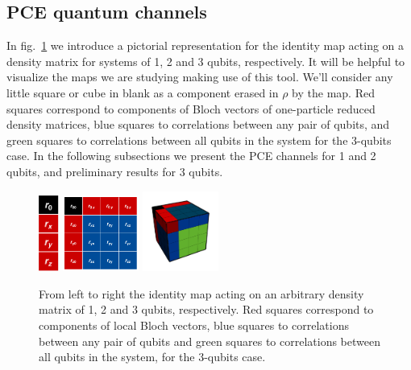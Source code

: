 \documentclass[11pt,dvipsnames]{article} %
\newcommand{\fref}[1]{fig.~\ref{#1}}
\newcommand{\1}{\mathds{1}}
\begin{document}
\subsection*{PCE quantum channels}
In \fref{fig:pictorial-rep-rho} we introduce a pictorial representation 
for the identity map acting on a density matrix for systems 
of 1, 2 and 3 qubits,
respectively. It will be helpful to visualize the maps we are studying 
making use of this tool. We'll consider any little square or cube in blank
as a component erased in $\rho$ by the map. 
Red squares correspond to components of Bloch vectors of one-particle reduced density matrices,
blue squares to correlations between any pair of qubits, and
green squares to correlations between all qubits in the system for
the 3-qubits case.
In the following subsections we present the PCE channels for
1 and 2 qubits, and preliminary results for 3 qubits.
\begin{figure}[H] %
	\centering
	\hfill \hfill
	\includegraphics[height=2.5cm]	{tablero-1q}
	\hfill
	\includegraphics[width=2.5cm]{rho2q(2)}
	\hfill 
	\includegraphics[width=2.5cm]{rho-3q}
	\hfill \hfill
	\caption{From left to right the identity map acting on
  an arbitrary density matrix of 1, 2 and 3 qubits, respectively. 
	Red squares correspond to components of local Bloch vectors,
	blue squares to correlations between any pair of qubits and
	green squares to correlations between all qubits in the system, for
	the 3-qubits case. }
	\label{fig:pictorial-rep-rho}
\end{figure} %
\end{document}
